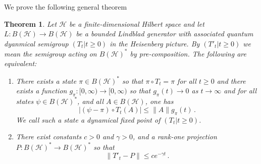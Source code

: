 \documentclass{article}
\newcommand{\<}{\langle}
\renewcommand{\>}{\rangle}
\numberwithin{equation}{section}
\newtheorem{thm}{Theorem}[section]
\theoremstyle{definition}
\begin{document}
We prove the following general theorem 
\begin{thm}\label{thm:exponential_steady_state}
	Let $\mathcal{H}$ be a finite-dimensional Hilbert space and let $L:B(\mathcal{H})\to B(\mathcal{H})$ be a bounded Lindblad generator with associated quantum dyanmical semigroup $(T_t | t\ge 0)$ in the Heisenberg picture. By $(T'_t|t\ge 0)$ we mean the semigroup acting on $B(\mathcal{H})^*$ by pre-composition. The following are equivalent: 
	\begin{enumerate}
		\item There exists a state $\pi\in B(\mathcal{H})^*$ so that $\pi\circ T_t = \pi$ for all $t\ge 0$ and there exists a function $g_{\pi}:[0, \infty) \to [0, \infty)$ so that $g_{\pi}(t) \to 0$ as $t\to \infty$ and for all  states $\psi\in B(\mathcal{H})^*$, and all $A\in B(\mathcal{H})$, one has 
			\begin{equation}
				|(\psi - \pi)\circ T_t(A)| \le \|A\| g_{\pi}(t)\,.
			\end{equation} We call such a state a \textit{dynamical fixed point} of $(T_t|t\ge 0)$. 
		\item There exist constants $c>0$ and $\gamma >0$, and a rank-one projection $P:B(\mathcal{H})^* \to B(\mathcal{H})^*$ so that 
		\begin{equation}
			\|T'_t - P\|\le ce^{-\gamma t}\,.
		\end{equation} 
	\end{enumerate}
\end{thm}
\end{document}
